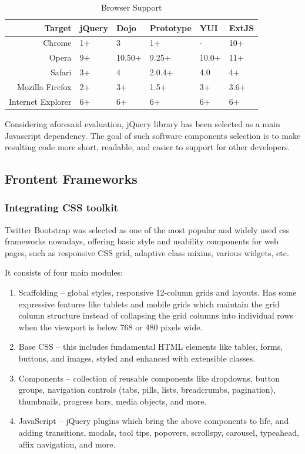 \begin{table}[H]
\centering
\begin{tabular}{|r|l|l|l|l|l|}
\hline
Target 			& jQuery & Dojo & Prototype & YUI & ExtJS \\
\hline
\hline
Chrome		& 1+ & 3 & 1+ & - & 10+ \\
\hline
Opera		& 9+ & 10.50+ & 9.25+ & 10.0+ & 11+ \\
\hline
Safari		& 3+ & 4 & 2.0.4+ & 4.0 & 4+ \\
\hline
Mozilla Firefox		& 2+ & 3+ & 1.5+ & 3+ & 3.6+ \\
\hline
Internet Explorer		& 6+ & 6+ & 6+ & 6+ & 6+ \\
\hline
\end{tabular}
\caption[Browser Support]{Browser Support}
\end{table}


 Considering aforesaid evaluation, jQuery library has been selected as a main Javascript dependency. The goal of such software components selection is to make resulting code more short, readable, and easier to support for other developers.

\subsection{Frontent Frameworks}
\subsubsection{Integrating CSS toolkit}
Twitter Bootstrap was selected as one of the most popular and widely used css frameworks nowadays, offering basic style and usability components for web pages, such as responsive CSS grid, adaptive class mixins, various widgets, etc. 

It consists of four main modules:
\begin{enumerate}
\item Scaffolding – global styles, responsive 12-column grids and layouts. Has some expressive features like tablets and mobile grids which maintain the grid column structure instead of collapsing the grid columns into individual rows when the viewport is below 768 or 480 pixels wide.
\item Base CSS – this includes fundamental HTML elements like tables, forms, buttons, and images, styled and enhanced with extensible classes.
\item Components – collection of reusable components like dropdowns, button groups, navigation controls (tabs, pills, lists, breadcrumbs, pagination), thumbnails, progress bars, media objects, and more.
\item JavaScript – jQuery plugins which bring the above components to life, and adding transitions, modals, tool tips, popovers, scrollspy, carousel, typeahead, affix navigation, and more. 
\end{enumerate}

